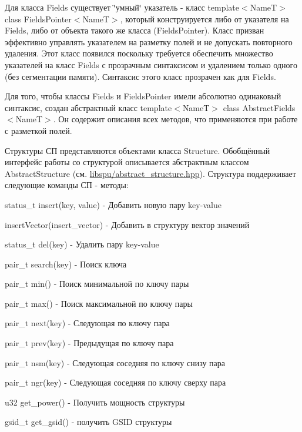 Для класса {\ttfamily Fields} существует \char`\"{}умный\char`\"{} указатель -\/ класс {\ttfamily template$<$NameT$>$ class Fields\+Pointer$<$NameT$>$}, который конструируется либо от указателя на {\ttfamily Fields}, либо от объекта такого же класса ({\ttfamily Fields\+Pointer}). Класс призван эффективно управлять указателем на разметку полей и не допускать повторного удаления. Этот класс появился поскольку требуется обеспечить множество указателей на класс {\ttfamily Fields} с прозрачным синтаксисом и удалением только одного (без сегментации памяти). Синтаксис этого класс прозрачен как для {\ttfamily Fields}.

Для того, чтобы классы {\ttfamily Fields} и {\ttfamily Fields\+Pointer} имели абсолютно одинаковый синтаксис, создан абстрактный класс {\ttfamily template$<$NameT$>$ class Abstract\+Fields$<$NameT$>$}. Он содержит описания всех методов, что применяются при работе с разметкой полей. 



Структуры СП представляются объектами класса {\ttfamily Structure}. Обобщённый интерфейс работы со структурой описывается абстрактным классом Abstract\+Structure (см. {\ttfamily \hyperlink{abstract__structure_8hpp_source}{libspu/abstract\+\_\+structure.\+hpp}}). Структура поддерживает следующие команды СП -\/ методы\+:


\begin{DoxyItemize}
\item status\+\_\+t insert(key, value) -\/ Добавить новую пару key-\/value
\item insert\+Vector(insert\+\_\+vector) -\/ Добавить в структуру вектор значений
\item status\+\_\+t del(key) -\/ Удалить пару key-\/value
\item pair\+\_\+t search(key) -\/ Поиск ключа
\item pair\+\_\+t min() -\/ Поиск минимальной по ключу пары
\item pair\+\_\+t max() -\/ Поиск максимальной по ключу пары
\item pair\+\_\+t next(key) -\/ Следующая по ключу пара
\item pair\+\_\+t prev(key) -\/ Предыдущая по ключу пара
\item pair\+\_\+t nsm(key) -\/ Следующая соседняя по ключу снизу пара
\item pair\+\_\+t ngr(key) -\/ Следующая соседняя по ключу сверху пара
\item u32 get\+\_\+power() -\/ Получить мощность структуры
\item gsid\+\_\+t get\+\_\+gsid() -\/ получить G\+S\+ID структуры
\end{DoxyItemize}


